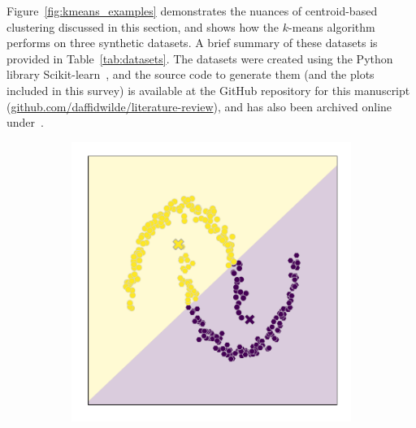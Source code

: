 Figure~\ref{fig:kmeans_examples} demonstrates the nuances of centroid-based
clustering discussed in this section, and shows how the \(k\)-means algorithm
performs on three synthetic datasets. A brief summary of these datasets is
provided in Table~\ref{tab:datasets}. The datasets were created using the Python
library Scikit-learn~\cite{scikit-learn}, and the source code to generate them
(and the plots included in this survey) is available at the GitHub repository
for this manuscript (\url{github.com/daffidwilde/literature-review}), and has
also been archived online under~.

\begin{figure}
    \centering
    \begin{subfigure}{.333\textwidth}
        \includegraphics[width=\linewidth]{kmeans/moons}
        \caption{}\label{fig:kmeans_moons}
    \end{subfigure}%
    \hfill%
    \begin{subfigure}{.333\textwidth}

\end{subfigure}
\end{figure}
